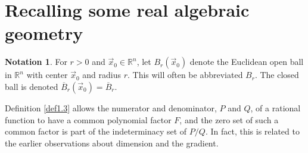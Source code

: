 \documentclass[12pt]{amsart}
\theoremstyle{definition}
\newtheorem{notation}[thm]{Notation}
\theoremstyle{remark}
\numberwithin{equation}{section}
\newcommand{\re}{\mathbb{R}}
\begin{document}
\section{Recalling some real algebraic geometry}

\begin{notation}\label{not4.1}
  For $r>0$ and $\vec x_0\in\re^n$, let $B_r(\vec x_0)$ denote the Euclidean open ball in $\re^n$ with center $\vec x_0$ and radius $r$.  This will often be abbreviated $B_r$.  The closed ball is denoted $\overline B_r(\vec x_0)=\overline B_r$.
\end{notation}

Definition \ref{def1.3} allows the numerator and denominator, $P$ and $Q$, of a rational function to have a common polynomial factor $F$, and the zero set of such a common factor is part of the indeterminacy set of $P/Q$.  In fact, this is related to the earlier observations about dimension and the gradient.

\end{document}
